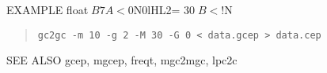 \begin{qsection}{EXAMPLE}
float$B7A<0$N0lHL2=%
30$B<!$N%
\begin{quote}
 \verb!gc2gc -m 10 -g 2 -M 30 -G 0 < data.gcep > data.cep!
\end{quote} 
\end{qsection}

\begin{qsection}{SEE ALSO}
gcep, mgcep, freqt, mgc2mgc, lpc2c
\end{qsection}
